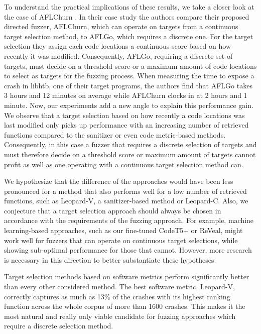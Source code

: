 To understand the practical implications of these results, we take a closer look at the case of AFLChurn \cite{ZhuBöh21}. In their case study the authors compare their proposed directed fuzzer, AFLChurn, which can operate on targets from a continuous target selection method, to AFLGo, which requires a discrete one. For the target selection they assign each code locations a continuous score based on how recently it was modified. Consequently, AFLGo, requiring a discrete set of targets, must decide on a threshold score or a maximum amount of code locations to select as targets for the fuzzing process.
%
When measuring the time to expose a crash in libhtb, one of their target programs, the authors find that AFLGo takes 3 hours and 12 minutes on average while AFLChurn clocks in at 2 hours and 1 minute. Now, our experiments add a new angle to explain this performance gain. We observe that a target selection based on how recently a code locations was last modified only picks up performance with an increasing number of retrieved functions compared to the sanitizer or even code metric-based methods. Consequently, in this case a fuzzer that requires a discrete selection of targets and must therefore decide on a threshold score or maximum amount of targets cannot profit as well as one operating with a continuous target selection method can.

We hypothesize that the difference of the approaches would have been less pronounced for a method that also performs well for a low number of retrieved functions, such as Leopard-V, a sanitizer-based method or Leopard-C. Also, we conjecture that a target selection approach should always be chosen in accordance with the requirements of the fuzzing approach. For example, machine learning-based approaches, such as our fine-tuned CodeT5+ or ReVeal, might work well for fuzzers that can operate on continuous target selections, while showing sub-optimal performance for those that cannot. However, more research is necessary in this direction to better substantiate these hypotheses. %

\cend

\begin{tcolorbox}[boxrule=1pt, arc=1mm, colback=white, colframe=coldefault]
	Target selection methods based on software metrics perform significantly
	better than every other considered method. The best software metric,
	Leopard-V, correctly captures as much as 13\% of the crashes with its
	highest ranking function across the whole corpus of more than 1600 crashes. This makes it the most natural and really only viable candidate for
	  fuzzing approaches which require a discrete selection method.
\end{tcolorbox}

